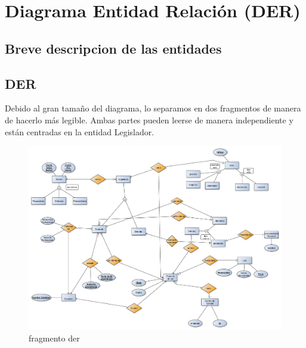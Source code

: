 \documentclass[10pt, a4paper]{article}
\begin{document}
\newpage

\section{Diagrama Entidad Relaci\'on (DER)}

	\subsection{Breve descripcion de las entidades}

		

	\newpage
	\subsection{DER}

		Debido al gran tama\~no del diagrama, lo separamos en dos fragmentos de manera de hacerlo m\'as legible. Ambas partes pueden leerse de manera independiente y est\'an centradas en la entidad Legislador.
			
		\begin{figure}[ht]
		    \includegraphics[scale=.30]{./imagenes/DERParteDeAbajo.pdf}
		    \caption{fragmento der} 
		    \label{fig:derparte1}
		\end{figure}
				
\end{document}
